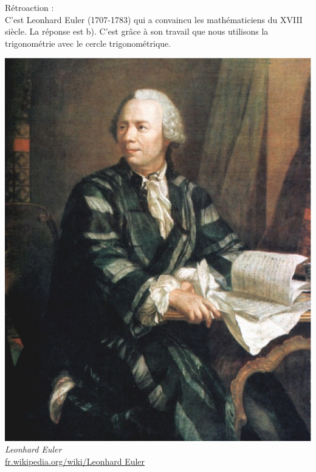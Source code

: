\documentclass[letterpaper, 12pt]{article}
\begin{document}
R\'etroaction :\\
C'est Leonhard Euler (1707-1783) qui a convaincu les math\'ematiciens du {\scriptsize XVIII\ieme{}} si\`ecle. La r\'eponse est b). C'est gr\^ace \`a son travail que nous utilisons la trigonom\'etrie avec le cercle trigonom\'etrique.
\begin{center}
\includegraphics[scale=0.14]{Euler.eps}\\
\emph{{\small Leonhard Euler}}\\
\href{http://fr.wikipedia.org/wiki/Leonhard Euler}{fr.wikipedia.org/wiki/Leonhard Euler}\\[5mm]
\end{center}
\end{document}
